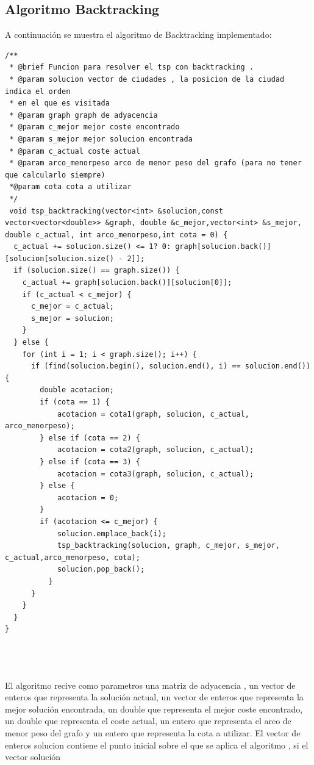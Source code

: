 \documentclass[11pt,openany]{book}
\begin{document}
\subsection{Algoritmo Backtracking}
A continuación se muestra el algoritmo de Backtracking implementado:

\begin{lstlisting}
/**
 * @brief Funcion para resolver el tsp con backtracking .
 * @param solucion vector de ciudades , la posicion de la ciudad indica el orden
 * en el que es visitada
 * @param graph graph de adyacencia
 * @param c_mejor mejor coste encontrado
 * @param s_mejor mejor solucion encontrada
 * @param c_actual coste actual
 * @param arco_menorpeso arco de menor peso del grafo (para no tener que calcularlo siempre)
 *@param cota cota a utilizar
 */
 void tsp_backtracking(vector<int> &solucion,const vector<vector<double>> &graph, double &c_mejor,vector<int> &s_mejor, double c_actual, int arco_menorpeso,int cota = 0) {
  c_actual += solucion.size() <= 1? 0: graph[solucion.back()][solucion[solucion.size() - 2]];
  if (solucion.size() == graph.size()) {
    c_actual += graph[solucion.back()][solucion[0]];
    if (c_actual < c_mejor) {
      c_mejor = c_actual;
      s_mejor = solucion;
    }
  } else {
    for (int i = 1; i < graph.size(); i++) {
      if (find(solucion.begin(), solucion.end(), i) == solucion.end()) {
        double acotacion;
        if (cota == 1) {
            acotacion = cota1(graph, solucion, c_actual, arco_menorpeso);
        } else if (cota == 2) {
            acotacion = cota2(graph, solucion, c_actual);
        } else if (cota == 3) {
            acotacion = cota3(graph, solucion, c_actual);
        } else {
            acotacion = 0;
        }
        if (acotacion <= c_mejor) {
            solucion.emplace_back(i);
            tsp_backtracking(solucion, graph, c_mejor, s_mejor, c_actual,arco_menorpeso, cota);
            solucion.pop_back();
          }
      }
    }
  }
}

  
                
    \end{lstlisting}

    El algoritmo recive como parametros una matriz de adyacencia , un vector de enteros que representa la solución actual, un vector de enteros que representa la mejor solución encontrada, un double que representa el mejor coste encontrado, un double que representa el coste actual, un entero que representa el arco de menor peso del grafo y un entero que representa la cota a utilizar.
    El vector de enteros solucion contiene el punto inicial sobre el que se aplica el algoritmo , si el vector solución
    
\end{document}
